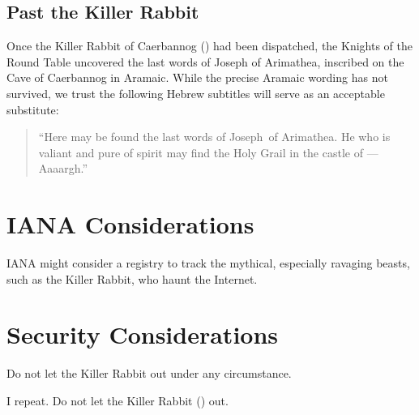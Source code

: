 \documentclass{metanorma}
\begin{document}
\subsection{Past the Killer Rabbit}

Once the Killer Rabbit of Caerbannog () had been
dispatched, the Knights of the Round Table uncovered the last
words of Joseph of Arimathea, inscribed on the Cave of Caerbannog
in Aramaic.  While the precise Aramaic wording has not survived,
we trust the following Hebrew subtitles will serve as an
acceptable substitute:


\begin{quote}

``Here may be found the last words of Joseph~of Arimathea.
He who is valiant and pure of spirit may find the Holy Grail
in the castle of --- Aaaargh.''
\end{quote}



\section{IANA Considerations}

IANA might consider a registry to track the mythical, especially
ravaging beasts, such as the Killer Rabbit, who haunt the Internet.


\section{Security Considerations}

Do not let the Killer Rabbit out under any circumstance.

I repeat. Do not let the Killer Rabbit () out.



\begin{thebibliography}{1}
\end{thebibliography}
\end{document}
